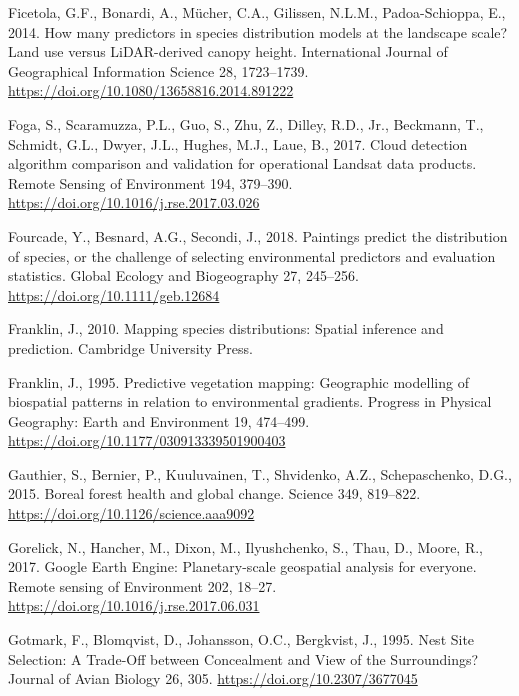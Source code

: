 \documentclass[
]{article}
\newlength{\cslhangindent}
\newlength{\cslentryspacingunit} %
\newenvironment{CSLReferences}[2] %
 {%
  \setlength{\parindent}{0pt}
  \ifodd #1
  \let\oldpar\par
  \def\par{\hangindent=\cslhangindent\oldpar}
  \fi
  \setlength{\parskip}{#2\cslentryspacingunit}
 }%
 {}
\begin{document}
\begin{CSLReferences}{1}{0}
\leavevmode{}%
Ficetola, G.F., Bonardi, A., Mücher, C.A., Gilissen, N.L.M., Padoa-Schioppa, E., 2014. How many predictors in species distribution models at the landscape scale? {Land} use versus {LiDAR}-derived canopy height. International Journal of Geographical Information Science 28, 1723--1739. \url{https://doi.org/10.1080/13658816.2014.891222}

\leavevmode{}%
Foga, S., Scaramuzza, P.L., Guo, S., Zhu, Z., Dilley, R.D., Jr., Beckmann, T., Schmidt, G.L., Dwyer, J.L., Hughes, M.J., Laue, B., 2017. Cloud detection algorithm comparison and validation for operational {Landsat} data products. Remote Sensing of Environment 194, 379--390. \url{https://doi.org/10.1016/j.rse.2017.03.026}

\leavevmode{}%
Fourcade, Y., Besnard, A.G., Secondi, J., 2018. Paintings predict the distribution of species, or the challenge of selecting environmental predictors and evaluation statistics. Global Ecology and Biogeography 27, 245--256. \url{https://doi.org/10.1111/geb.12684}

\leavevmode{}%
Franklin, J., 2010. Mapping species distributions: Spatial inference and prediction. Cambridge University Press.

\leavevmode{}%
Franklin, J., 1995. Predictive vegetation mapping: Geographic modelling of biospatial patterns in relation to environmental gradients. Progress in Physical Geography: Earth and Environment 19, 474--499. \url{https://doi.org/10.1177/030913339501900403}

\leavevmode{}%
Gauthier, S., Bernier, P., Kuuluvainen, T., Shvidenko, A.Z., Schepaschenko, D.G., 2015. Boreal forest health and global change. Science 349, 819--822. \url{https://doi.org/10.1126/science.aaa9092}

\leavevmode{}%
Gorelick, N., Hancher, M., Dixon, M., Ilyushchenko, S., Thau, D., Moore, R., 2017. Google {Earth} {Engine}: {Planetary}-scale geospatial analysis for everyone. Remote sensing of Environment 202, 18--27. \url{https://doi.org/10.1016/j.rse.2017.06.031}

\leavevmode{}%
Gotmark, F., Blomqvist, D., Johansson, O.C., Bergkvist, J., 1995. Nest {Site} {Selection}: {A} {Trade}-{Off} between {Concealment} and {View} of the {Surroundings}? Journal of Avian Biology 26, 305. \url{https://doi.org/10.2307/3677045}


\end{CSLReferences}
\end{document}
